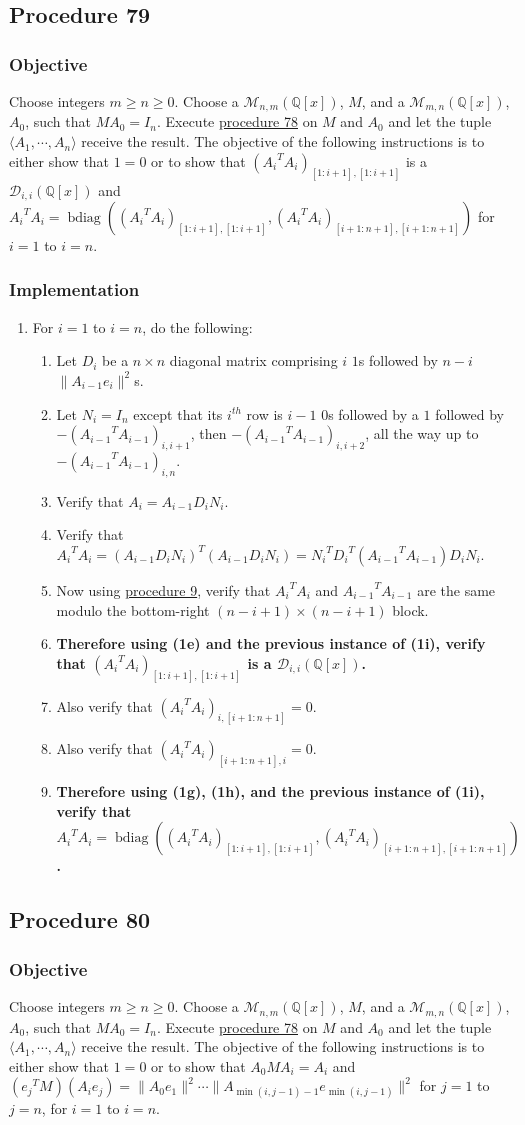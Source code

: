 \documentclass[twocolumn]{article}
\DeclareMathOperator{\bdiag}{bdiag}
\newcommand{\procedure}[2][]{\subsection*{Procedure #2 \ifthenelse{\equal{#1}{}}{}{(#1)}}\label{sec:procedure #2}}
\newcommand{\objective}{\subsubsection*{Objective}}
\newcommand{\implementation}{\subsubsection*{Implementation}}
\begin{document}
		\procedure{79}
			\objective
				Choose integers $m\ge n\ge 0$. Choose a $\mathcal{M}_{n,m}(\mathbb{Q}[x])$, $M$, and a $\mathcal{M}_{m,n}(\mathbb{Q}[x])$, $A_0$, such that $MA_0=I_n$. Execute \hyperref[sec:procedure 78]{procedure 78} on $M$ and $A_0$ and let the tuple $\langle A_1,\cdots,A_n\rangle$ receive the result. The objective of the following instructions is to either show that $1=0$ or to show that $({A_i}^TA_i)_{[1:i+1],[1:i+1]}$ is a $\mathcal{D}_{i,i}(\mathbb{Q}[x])$ and ${A_i}^TA_i=\bdiag(({A_i}^TA_i)_{[1:i+1],[1:i+1]},({A_i}^TA_i)_{[i+1:n+1],[i+1:n+1]})$ for $i=1$ to $i=n$.
			\implementation
				\begin{enumerate}
					\item For $i=1$ to $i=n$, do the following:
					\begin{enumerate}
						\item Let $D_i$ be a $n\times n$ diagonal matrix comprising $i$ $1$s followed by $n-i$ $\lVert A_{i-1}e_i\rVert^2$s.
						\item Let $N_i=I_n$ except that its $i^{th}$ row is $i-1$ $0$s followed by a $1$ followed by $-({A_{i-1}}^TA_{i-1})_{i,i+1}$, then $-({A_{i-1}}^TA_{i-1})_{i,i+2}$, all the way up to $-({A_{i-1}}^TA_{i-1})_{i,n}$.
						\item Verify that $A_i=A_{i-1}D_iN_i$.
						\item Verify that ${A_i}^TA_i=(A_{i-1}D_iN_i)^T(A_{i-1}D_iN_i)={N_i}^T{D_i}^T({A_{i-1}}^TA_{i-1})D_iN_i$.
						\item Now using \hyperref[sec:procedure 9]{procedure 9}, verify that ${A_i}^TA_i$ and ${A_{i-1}}^TA_{i-1}$ are the same modulo the bottom-right $(n-i+1)\times(n-i+1)$ block.
						\item \textbf{Therefore using (1e) and the previous instance of (1i), verify that $({A_i}^TA_i)_{[1:i+1],[1:i+1]}$ is a $\mathcal{D}_{i,i}(\mathbb{Q}[x])$.}
						\item Also verify that $({A_i}^TA_i)_{i,[i+1:n+1]}=0$.
						\item Also verify that $({A_i}^TA_i)_{[i+1:n+1],i}=0$.
						\item \textbf{Therefore using (1g), (1h), and the previous instance of (1i), verify that ${A_i}^TA_i=\bdiag(({A_i}^TA_i)_{[1:i+1],[1:i+1]},({A_i}^TA_i)_{[i+1:n+1],[i+1:n+1]})$.}
					\end{enumerate}
				\end{enumerate}
		\procedure{80}
			\objective
				Choose integers $m\ge n\ge 0$. Choose a $\mathcal{M}_{n,m}(\mathbb{Q}[x])$, $M$, and a $\mathcal{M}_{m,n}(\mathbb{Q}[x])$, $A_0$, such that $MA_0=I_n$. Execute \hyperref[sec:procedure 78]{procedure 78} on $M$ and $A_0$ and let the tuple $\langle A_1,\cdots,A_n\rangle$ receive the result. The objective of the following instructions is to either show that $1=0$ or to show that $A_0MA_i=A_i$ and $({e_j}^TM)(A_ie_j)=\lVert A_0e_1\rVert^2\cdots\lVert A_{\min(i,j-1)-1}e_{\min(i,j-1)}\rVert^2$ for $j=1$ to $j=n$, for $i=1$ to $i=n$.
\end{document}
